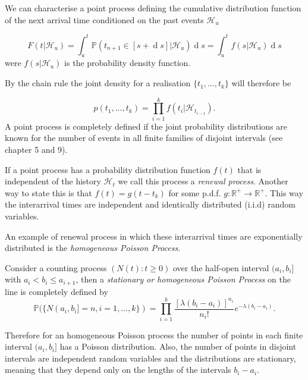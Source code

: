 \documentclass[11pt,a4paper]{article}
\renewcommand{\d}[1]{\ensuremath{\operatorname{d}\!{#1}}}
\begin{document}
We can characterise a point process defining the cumulative distribution function of the next arrival time conditioned on the past events $\mathcal{H}_u$

\begin{equation} \label{eq:CumDistPointProc}
    F(t|\mathcal{H}_u) = \int_u^t \mathbb{P}(t_{n+1} \in [s+\d s] | \mathcal{H}_u) \d s = \int_u^t f(s | \mathcal{H}_u) \d s
\end{equation}
were $f(s | \mathcal{H}_u)$ is the probability density function.

By the chain rule the joint density for a realisation $\{ t_1, \dots, t_k\}$ will therefore be

\begin{equation}\label{eq:JointDensHawkes}
    p(t_1, \dots, t_k) = \prod_{i=1}^k f(t_i | \mathcal{H}_{t_{i-1}}).
\end{equation}
A point process is completely defined if the joint probability distributions are known for the number of events in all finite families of disjoint intervals (see  \cite{Daley} chapter 5 and 9).

If a point process has a probability distribution function $f(t)$ that is independent of the history $\mathcal{H}_t$ we call this process a \textit{renewal process}. Another way to state this is that $f(t) = g(t - t_k)$ for some p.d.f. $g : \mathbb{R}^+ \rightarrow \mathbb{R}^+$. This way the interarrival times are independent and identically distributed (i.i.d) random variables.

An example of renewal process in which these interarrival times are exponentially distributed is the \textit{homogeneous Poisson Process}.

\begin{definition}\label{def:HomPoi}
    Consider a counting process $(N(t):t \geq 0)$ over the half-open interval $(a_i, b_i]$ with $a_i < b_i \leq a_{i+1}$, then a \textit{stationary or homogeneous Poisson Process} on the line is completely defined by
    \begin{equation}\label{001}
        \mathbb{P}(\{N(a_i, b_i] = n, i = 1, \dots, k \}) = \prod_{i=1}^k \frac{[\lambda(b_i - a_i)]^{n_i}}{n_i!}e^{-\lambda(b_i-a_i)}.
    \end{equation}
\end{definition}
Therefore for an homogeneous Poisson process the number of points in each finite interval $(a_i, b_i]$ has a Poisson distribution. Also, the number of points in disjoint intervals are independent random variables and the distributions are stationary, meaning that they depend only on the lengths of the intervals $b_i - a_i$.
\end{document}
